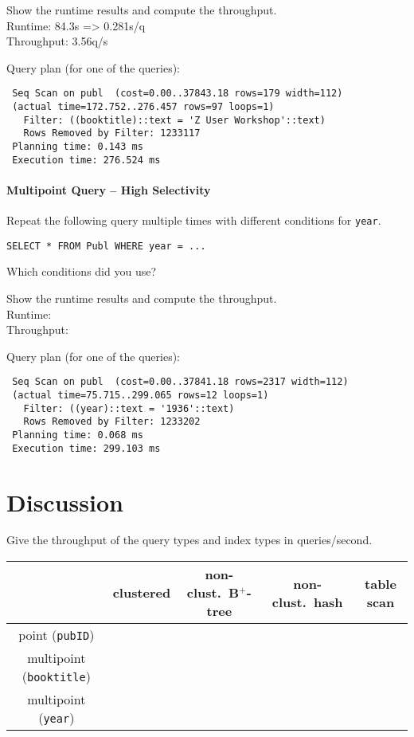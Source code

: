 \documentclass[11pt]{scrartcl}
\begin{document}
\smallskip\noindent
Show the runtime results and compute the throughput.\\
Runtime: 84.3s => 0.281s/q\\
Throughput: 3.56q/s

\smallskip\noindent
Query plan (for one of the queries):
{\small
\begin{verbatim}
 Seq Scan on publ  (cost=0.00..37843.18 rows=179 width=112)
 (actual time=172.752..276.457 rows=97 loops=1)
   Filter: ((booktitle)::text = 'Z User Workshop'::text)
   Rows Removed by Filter: 1233117
 Planning time: 0.143 ms
 Execution time: 276.524 ms
\end{verbatim}
}


\paragraph{Multipoint Query -- High Selectivity}

Repeat the following query multiple times with different conditions for {\tt year}.

{\small
\begin{verbatim}
SELECT * FROM Publ WHERE year = ...
\end{verbatim}
}

\noindent
Which conditions did you use?

\smallskip\noindent
Show the runtime results and compute the throughput.\\
Runtime: \\
Throughput: 


\smallskip\noindent
Query plan (for one of the queries):
{\small
\begin{verbatim}
 Seq Scan on publ  (cost=0.00..37841.18 rows=2317 width=112)
 (actual time=75.715..299.065 rows=12 loops=1)
   Filter: ((year)::text = '1936'::text)
   Rows Removed by Filter: 1233202
 Planning time: 0.068 ms
 Execution time: 299.103 ms
\end{verbatim}
}

\section{Discussion}

Give the throughput of the query types and index types in queries/second.
\begin{center}
  \begin{tabular}{c|c|c|c|c}
    & clustered & non-clust.\ B$^+$-tree & non-clust.\ hash & table scan \\
    \hline
    point ({\tt pubID}) & & & \\
    \hline
    multipoint ({\tt booktitle}) & & & \\
    \hline
    multipoint  ({\tt year}) & & & \\  
  \end{tabular}
\end{center}
\end{document}
